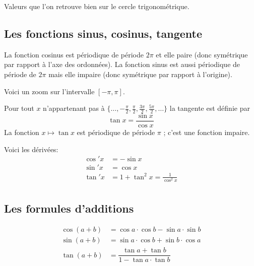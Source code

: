\documentclass[class=report,crop=false]{standalone}
\begin{document}
Valeurs que l'on retrouve bien sur le cercle trigonométrique.

\subsection{Les fonctions sinus, cosinus, tangente}

La fonction cosinus est périodique de période $2\pi$
et elle paire (donc symétrique par rapport à l'axe des ordonnées).
La fonction sinus est aussi périodique de période de $2\pi$ mais elle impaire
(donc symétrique par rapport à l'origine).




Voici un zoom sur l'intervalle $[-\pi,\pi]$.


Pour tout $x$ n'appartenant pas à $\{\ldots, -\frac\pi2, \frac\pi2, \frac{3\pi}{2}, \frac{5\pi}{2},\ldots  \}$
la tangente est définie par
$$\tan x = \frac{\sin x}{\cos x}$$
La fonction $x \mapsto \tan x$ est périodique de période $\pi$ ; c'est une fonction impaire.



Voici les dérivées:
\begin{align*}
\cos'x&= -\sin x\\
\sin'x&=\cos x\\
\tan' x &= 1+\tan^2x=\frac{1}{\cos^2x}\\
\end{align*}




\subsection{Les formules d'additions}



\begin{align*}
\cos(a+b) &= \cos a \cdot \cos b - \sin a \cdot \sin b \\
\sin(a+b) &= \sin a\cdot \cos b  +  \sin b\cdot\cos a \\
\tan (a+b) &=\dfrac{\tan a + \tan b}{1-\tan a \cdot \tan b}\\
\end{align*}
\end{document}
